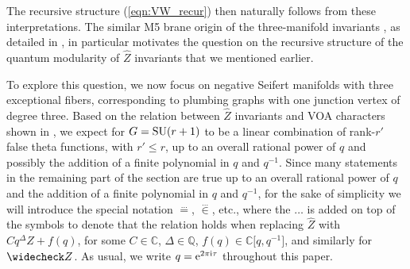 \documentclass[pdftex]{sigma}
\newcommand{\CC}{\mathbb{C}}
\newcommand{\QQ}{\mathbb{Q}}
\def\bv{{\vec{\underline{b}}}}
\theoremstyle{definition}
\numberwithin{equation}{section}
\begin{document}
The recursive structure (\ref{eqn:VW_recur}) then naturally follows from these interpretations.
The similar M5 brane origin of the three-manifold invariants , as detailed in \cite{Gukov:2016gkn}, in particular motivates the question on the recursive structure of the quantum modularity of $\widehat Z$ invariants that we mentioned earlier.

To explore this question, we now focus on negative Seifert manifolds with three exceptional fibers, corresponding to plumbing graphs with one junction vertex of degree three. Based on the relation between $\widehat Z$ invariants and VOA characters shown in \cite{chengUpC,cheng20193d}, we expect \smash{$\widehat Z^G_\bv (M_3)$} for $G={\rm SU}(r+1)$ to be a linear combination of rank-$r'$ false theta functions, with $r'\leq r$, up to an overall rational power of $q$ and possibly the addition of a finite polynomial in $q$ and $q^{-1}$. Since many statements in the remaining part of the section are true up to an overall rational power of $q$ and the addition of a finite polynomial in $q$ and $q^{-1}$, for the sake of simplicity we will introduce the special notation $\stackrel{\dots}{=}$, $\stackrel{\dots}{\in}$, etc., where the $\dots$ is added on top of the symbols to denote that the relation holds when replacing $\widehat Z$ with $Cq^{\Delta}\widehat Z+f(q)$, for some $C\in \CC$, $\Delta\in \QQ$, $f(q)\in \CC\big[q,q^{-1}\big]$, and similarly for $\widecheck Z$. As usual, we write $q={\rm e}^{2\pi {\rm i} \tau}$ throughout this paper.
\end{document}
